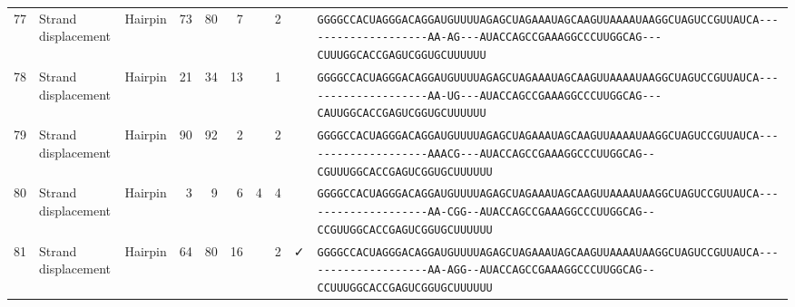 \begin{tabular}{rllrrrrrcl}
 77 & Strand displacement & Hairpin & 73 & 80 & 7 &   & 2 &  &
 \color{ucsfdarkgrey}\verb|GGGGCCACUAGGGACAGGAU|\color{ucsforange}\verb|GUUUUA|\color{ucsfblue}\verb|GAGCUAGAAAUAGCAAGU|\color{ucsforange}\verb|UAAAAUAA|\color{ucsfnavy}\verb|GGCUAGUCCGU|\color{ucsforange}\verb|UAUCA|\color{ucsfteal}\verb|--------------------AA-AG---|\color{ucsfpurple}\verb|AUACCAGCCGAAAGGCCCUUGGCAG|\color{ucsfteal}\verb|---CUUU|\color{ucsforange}\verb|GGCACCGAGUCGGUGCUUUUUU| \\

 78 & Strand displacement & Hairpin & 21 & 34 & 13 &  & 1 &  &
 \color{ucsfdarkgrey}\verb|GGGGCCACUAGGGACAGGAU|\color{ucsforange}\verb|GUUUUA|\color{ucsfblue}\verb|GAGCUAGAAAUAGCAAGU|\color{ucsforange}\verb|UAAAAUAA|\color{ucsfnavy}\verb|GGCUAGUCCGU|\color{ucsforange}\verb|UAUCA|\color{ucsfteal}\verb|--------------------AA-UG---|\color{ucsfpurple}\verb|AUACCAGCCGAAAGGCCCUUGGCAG|\color{ucsfteal}\verb|---CAUU|\color{ucsforange}\verb|GGCACCGAGUCGGUGCUUUUUU| \\

 79 & Strand displacement & Hairpin & 90 & 92 & 2 &   & 2 &  &
 \color{ucsfdarkgrey}\verb|GGGGCCACUAGGGACAGGAU|\color{ucsforange}\verb|GUUUUA|\color{ucsfblue}\verb|GAGCUAGAAAUAGCAAGU|\color{ucsforange}\verb|UAAAAUAA|\color{ucsfnavy}\verb|GGCUAGUCCGU|\color{ucsforange}\verb|UAUCA|\color{ucsfteal}\verb|--------------------AAACG---|\color{ucsfpurple}\verb|AUACCAGCCGAAAGGCCCUUGGCAG|\color{ucsfteal}\verb|--CGUUU|\color{ucsforange}\verb|GGCACCGAGUCGGUGCUUUUUU| \\

 80 & Strand displacement & Hairpin & 3 & 9 & 6 & 4 & 4 &  &
 \color{ucsfdarkgrey}\verb|GGGGCCACUAGGGACAGGAU|\color{ucsforange}\verb|GUUUUA|\color{ucsfblue}\verb|GAGCUAGAAAUAGCAAGU|\color{ucsforange}\verb|UAAAAUAA|\color{ucsfnavy}\verb|GGCUAGUCCGU|\color{ucsforange}\verb|UAUCA|\color{ucsfteal}\verb|--------------------AA-CGG--|\color{ucsfpurple}\verb|AUACCAGCCGAAAGGCCCUUGGCAG|\color{ucsfteal}\verb|--CCGUU|\color{ucsforange}\verb|GGCACCGAGUCGGUGCUUUUUU| \\

 81 & Strand displacement & Hairpin & 64 & 80 & 16 &   & 2 & ✓ &
 \color{ucsfdarkgrey}\verb|GGGGCCACUAGGGACAGGAU|\color{ucsforange}\verb|GUUUUA|\color{ucsfblue}\verb|GAGCUAGAAAUAGCAAGU|\color{ucsforange}\verb|UAAAAUAA|\color{ucsfnavy}\verb|GGCUAGUCCGU|\color{ucsforange}\verb|UAUCA|\color{ucsfteal}\verb|--------------------AA-AGG--|\color{ucsfpurple}\verb|AUACCAGCCGAAAGGCCCUUGGCAG|\color{ucsfteal}\verb|--CCUUU|\color{ucsforange}\verb|GGCACCGAGUCGGUGCUUUUUU| \\


\end{tabular}
